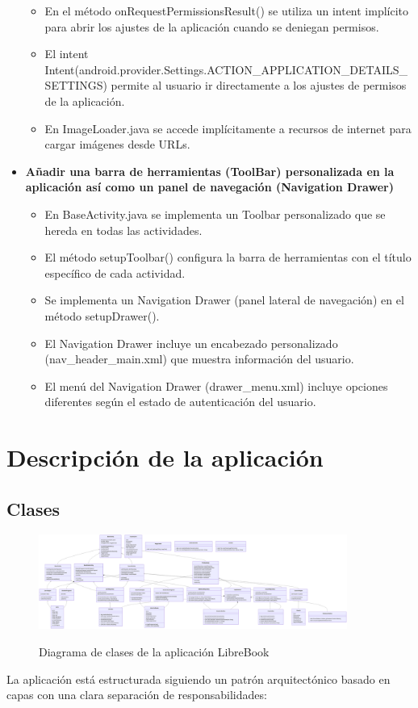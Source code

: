 \documentclass[a4paper,12pt]{report}
\begin{document}
\begin{itemize}
\begin{itemize}
          \item En el método onRequestPermissionsResult() se utiliza un intent implícito para abrir los ajustes de la aplicación cuando se deniegan permisos.
          \item El intent Intent(android.provider.Settings.ACTION\_APPLICATION\_DETAILS\_SETTINGS) permite al usuario ir directamente a los ajustes de permisos de la aplicación.
          \item En ImageLoader.java se accede implícitamente a recursos de internet para cargar imágenes desde URLs.
        \end{itemize}
        \item \textbf{Añadir una barra de herramientas (ToolBar) personalizada en la aplicación así como un panel de navegación (Navigation Drawer)}
        \begin{itemize}
          \item En BaseActivity.java se implementa un Toolbar personalizado que se hereda en todas las actividades.
          \item El método setupToolbar() configura la barra de herramientas con el título específico de cada actividad.
          \item Se implementa un Navigation Drawer (panel lateral de navegación) en el método setupDrawer().
          \item El Navigation Drawer incluye un encabezado personalizado (nav\_header\_main.xml) que muestra información del usuario.
          \item El menú del Navigation Drawer (drawer\_menu.xml) incluye opciones diferentes según el estado de autenticación del usuario.
        \end{itemize}
      \end{itemize}
  \chapter{Descripción de la aplicación}
    \section{Clases}
      \begin{figure}[H]
        \centering
        \href{https://raw.githubusercontent.com/Xabierland/DAS-Proyecto/refs/heads/main/Documentation/.img/diagrama-clases.svg}{%
          \includegraphics[width=0.9\textwidth]{.img/diagrama-clases.png} 
        }
        \caption{Diagrama de clases de la aplicación LibreBook}
        \label{fig:diagrama-clases}
      \end{figure}
      La aplicación está estructurada siguiendo un patrón arquitectónico basado en capas con una clara separación de responsabilidades:
\end{document}
